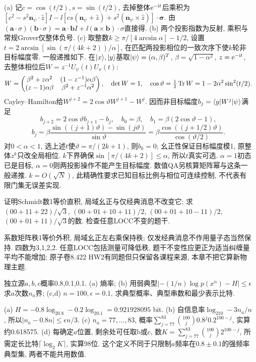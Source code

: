 \begin{solution}(a) 记$c=\cos(t/2),s=\sin(t/2)$, 去掉整体$\mathrm e^{-\mathrm i t}$后乘积为$[c^2-s^2\mathbf n_\psi\cdot\hat z]I-\ii[cs(\mathbf n_\psi+\hat z)+s^2(\mathbf n_\psi\times\hat z)]\cdot\boldsymbol\sigma$. 由$(\mathbf a\cdot\sigma)(\mathbf b\cdot\sigma)=\mathbf a\cdot\mathbf b I+\ii(\mathbf a\times\mathbf b)\cdot\sigma$直接得. (b) 两个投影指数为反射, 乘积与常规Grover仅整体负号. (c) 取整数$k\ge\pi/[4\arcsin\alpha]-1/2$, 设置$t=2\arcsin[\sin(\pi/(4k+2))/\alpha]$, 在匹配两投影相位的一致次序下使$k$轮非目标幅度零. 一般递推如下. 在$\lvert x\rangle,\lvert y\rangle$基取$\lvert \psi\rangle=(\alpha,\beta)^T$, $\beta=\sqrt{1-\alpha^2}$, $z=\mathrm e^{-\mathrm i t}$, 去整体相位后$W=z^{-1}U_\psi(t)U_x(t)$:
\[W=\begin{pmatrix}
 \beta^2+z\alpha^2&(1-z^{-1})\alpha\beta\\
 (z-1)\alpha\beta&\beta^2+z^{-1}\alpha^2
 \end{pmatrix},\quad \det W=1,\quad
 \cos\vartheta=\tfrac12\operatorname{Tr} W=1-2\alpha^2\sin^2(t/2).\]
Cayley--Hamilton给$W^{j+2}=2\cos\vartheta W^{j+1}-W^j$. 因而非目标幅度$b_j=\langle y\rvert W^j\lvert \psi\rangle$满足
\[b_{j+2}=2\cos\vartheta b_{j+1}-b_j,\quad
 b_0=\beta,\quad b_1=\beta(2\cos\vartheta-1),\]
\[b_j=\beta\frac{\sin((j+1)\vartheta)-\sin(j\vartheta)}{\sin\vartheta}
 =\beta\frac{\cos((j+1/2)\vartheta)}{\cos(\vartheta/2)}.\]
对$0<\alpha<1$, 选上述$t$使$\vartheta=\pi/(2k+1)$, 则$b_k=0$; 幺正性保证目标幅度模1, 原整体$z^k$只改全局相位. $k$下界确保$\sin[\pi/(4k+2)]\le\alpha$, 所以$t$真实可选. $\alpha=1$初态已是目标, $\alpha=0$则两投影操作不能产生目标幅度. 数值QA另核算矩阵幂与这条一般递推. $k=O(\sqrt N)$, 此精确性要求已知目标比例与相位可连续控制, 不代表有限门集无误差实现.
\end{solution}
\begin{exercise}证明Schmidt数1等价直积, 局域幺正与仅经典消息不改变它; 求$(00+11+22)/\sqrt3$, $(00+01+10+11)/2$, $(00+01+10-11)/2$, $(00+01+11)/\sqrt3$的数. 检查任意LOCC不变的题干.\end{exercise}
\begin{solution}系数矩阵秩1等价外积, 局域幺正左右乘保持秩; 仅发经典消息不作用量子态当然保持. 四数为3,1,2,2. 任意LOCC包括测量可降低秩, 题干不变性应更正为适当纠缠量平均不能增加; 原子卷8.422 HW2有同题但只保留各课程来源, 本章不把它算新物理主题.
\end{solution}
\begin{exercise}独立源$a,b,c$概率0.8,0.1,0.1. (a) 熵率; (b) 用弱典型$|-(1/n)\log p(x^n)-H|\le\epsilon$求$a$次数$n_a$界; (c,d) $n=100,\epsilon=0.1$, 求典型概率、典型串数和最少表示比特.\end{exercise}
\begin{solution}(a) $H=-0.8\log_20.8-0.2\log_20.1=0.921928095$ bit. (b) 自信息率$\log_210-3n_a/n$, 所以$|n_a-0.8n|\le\epsilon n/3$. (c) $n_a=77,\ldots,83$, 概率$\sum_{j=77}^{83}\binom{100}j0.8^j0.2^{100-j}$, 实算约0.618575. (d) 每确定$a$位置, 剩余处可任取b或c, 数$K=\sum_{j=77}^{83}\binom{100}j2^{100-j}$, 所需定长比特$\lceil\log_2K\rceil$, 实算98位. 这个定义不同于只限制$a$频率在$0.8\pm0.1$的强频率典型集, 两者不能共用数值.
\end{solution}
